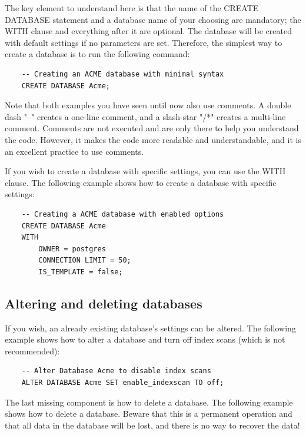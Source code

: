 The key element to understand here is that the name of the CREATE DATABASE statement and a database name of your choosing are mandatory; the WITH clause and everything after it are optional. The database will be created with default settings if no parameters are set. Therefore, the simplest way to create a database is to run the following command:

\begin{verbatim}
    -- Creating an ACME database with minimal syntax
    CREATE DATABASE Acme;
\end{verbatim}

Note that both examples you have seen until now also use comments. A double dash "--" creates a one-line comment, and a slash-star "/*" creates a multi-line comment. Comments are not executed and are only there to help you understand the code. However, it makes the code more readable and understandable, and it is an excellent practice to use comments.

If you wish to create a database with specific settings, you can use the WITH clause. The following example shows how to create a database with specific settings:

\begin{verbatim}
    -- Creating a ACME database with enabled options
    CREATE DATABASE Acme 
    WITH
        OWNER = postgres
        CONNECTION LIMIT = 50;
        IS_TEMPLATE = false;
\end{verbatim}

\subsection{Altering and deleting databases}
If you wish, an already existing database's settings can be altered. The following example shows how to alter a database and turn off index scans (which is not recommended):

\begin{verbatim}
    -- Alter Database Acme to disable index scans
    ALTER DATABASE Acme SET enable_indexscan TO off;
\end{verbatim}

The last missing component is how to delete a database. The following example shows how to delete a database. Beware that this is a permanent operation and that all data in the database will be lost, and there is no way to recover the data!

